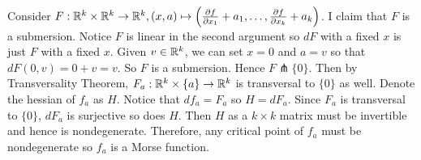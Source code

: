 \documentclass[12pt]{article}
\begin{document}
\begin{problem}[2.3.9]
Consider $ F: \mathbb{R}^{k} \times  \mathbb{R}^{k} \to \mathbb{R}^{k}, (x,a) \mapsto  \left(  \frac{\partial f}{\partial x_1} +a_1, \ldots, \frac{\partial f}{\partial x_k} +a_k  \right) $. I claim that $ F$ is a submersion. Notice $ F$ is linear in the second argument so $ dF$ with a fixed  $ x$ is just  $ F$ with a fixed  $ x$. Given $ v \in \mathbb{R}^{k}$, we can set $ x=0$ and  $ a=v$ so that  $ dF(0,v) = 0+v=v$. So $ F$ is a submersion. Hence  $ F \pitchfork \{0\}$. Then by Transversality Theorem, $ F_a: \mathbb{R}^{k} \times \{a\} \to \mathbb{R}^{k} $ is transversal to $ \{0\} $ as well. Denote the hessian of $ f_a$ as  $ H$. Notice that $ df_a = F_a$ so $ H = dF_a$. Since $ F_a$ is transversal to  $ \{0\} $, $ dF_a$ is surjective so does $ H$. Then $ H$ as a $ k\times k$ matrix must be invertible and hence is nondegenerate. Therefore, any critical point of $ f_a$ must be nondegenerate so $ f_a$ is a Morse function.
\end{problem}
\end{document}
